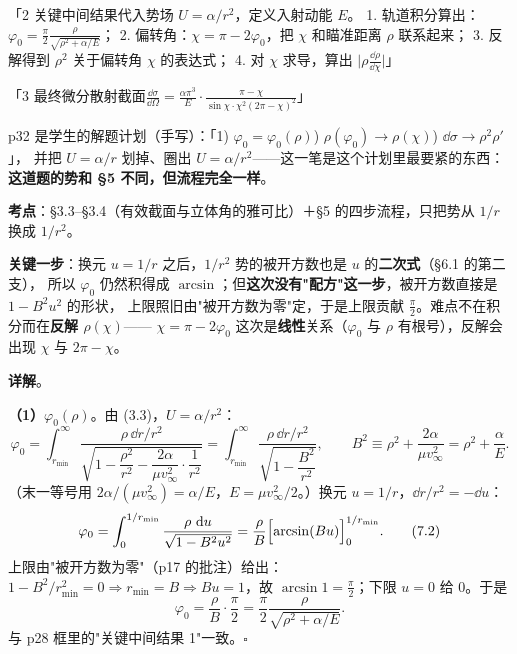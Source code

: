 \documentclass[11pt]{ctexart}
\begin{document}
「2 关键中间结果\quad 代入势场 $U=\alpha/r^2$，定义入射动能 $E$。
1. 轨道积分算出：$\varphi_0=\frac{\pi}{2}\frac{\rho}{\sqrt{\rho^2+\alpha/E}}$；
2. 偏转角：$\chi=\pi-2\varphi_0$，把 $\chi$ 和瞄准距离 $\rho$ 联系起来；
3. 反解得到 $\rho^2$ 关于偏转角 $\chi$ 的表达式；
4. 对 $\chi$ 求导，算出 $\bigl|\rho\frac{\dd\rho}{\dd\chi}\bigr|$」

「3 最终微分散射截面\quad $\frac{\dd\sigma}{\dd\Omega}=\frac{\alpha\pi^{3}}{E}\cdot\frac{\pi-\chi}{\sin\chi\cdot\chi^{2}(2\pi-\chi)^{2}}$」

p32 是学生的解题计划（手写）：「1) $\varphi_0=\varphi_0(\rho)$) $\rho(\varphi_0)\to\rho(\chi)$) $\dd\sigma\to\rho^{2}\rho'$」，
并把 $U=\alpha/r$ 划掉、圈出 $U=\alpha/r^{2}$——这一笔是这个计划里最要紧的东西：\textbf{这道题的势和 §5 不同，但流程完全一样}。


\textbf{考点}：§3.3--§3.4（有效截面与立体角的雅可比）＋§5 的四步流程，只把势从 $1/r$ 换成 $1/r^{2}$。

\textbf{关键一步}：换元 $u=1/r$ 之后，$1/r^{2}$ 势的被开方数也是 $u$ 的\textbf{二次式}（§6.1 的第二支），
所以 $\varphi_0$ 仍然积得成 $\arcsin$；但\textbf{这次没有"配方"这一步}，被开方数直接是 $1-B^{2}u^{2}$ 的形状，
上限照旧由"被开方数为零"定，于是上限贡献 $\frac\pi2$。难点不在积分而在\textbf{反解 $\rho(\chi)$}——
$\chi=\pi-2\varphi_0$ 这次是\textbf{线性}关系（$\varphi_0$ 与 $\rho$ 有根号），反解会出现 $\chi$ 与 $2\pi-\chi$。

\textbf{详解}。

\textbf{（1）$\varphi_0(\rho)$}。由 (3.3)，$U=\alpha/r^{2}$：
\[
\varphi_0=\int_{r_{\min}}^{\infty}\frac{\rho\,\dd r/r^{2}}{\sqrt{1-\dfrac{\rho^{2}}{r^{2}}-\dfrac{2\alpha}{\mu v_\infty^{2}}\cdot\dfrac{1}{r^{2}}}}
=\int_{r_{\min}}^{\infty}\frac{\rho\,\dd r/r^{2}}{\sqrt{1-\dfrac{B^{2}}{r^{2}}}},
\qquad B^{2}\equiv\rho^{2}+\frac{2\alpha}{\mu v_\infty^{2}}=\rho^{2}+\frac{\alpha}{E}. \tag{7.1}
\]
（末一等号用 $2\alpha/(\mu v_\infty^{2})=\alpha/E$，$E=\mu v_\infty^{2}/2$。）换元 $u=1/r$，$\dd r/r^{2}=-\dd u$：
\[
\varphi_0=\int_{0}^{1/r_{\min}}\frac{\rho\,\,\mathrm{d} u}{\sqrt{1-B^{2}u^{2}}}
=\frac{\rho}{B}\Bigl[\arcsin(Bu)\Bigr]_{0}^{1/r_{\min}} . \tag{7.2}
\]
上限由"被开方数为零"（p17 的批注）给出：$1-B^{2}/r_{\min}^{2}=0\Rightarrow r_{\min}=B\Rightarrow Bu=1$，故 $\arcsin1=\frac\pi2$；下限 $u=0$ 给 $0$。于是
\[
\varphi_0=\frac{\rho}{B}\cdot\frac\pi2=\frac{\pi}{2}\frac{\rho}{\sqrt{\rho^{2}+\alpha/E}} . \tag{7.3}
\]
与 p28 框里的"关键中间结果 1"一致。\hfill$\square$
\end{document}
